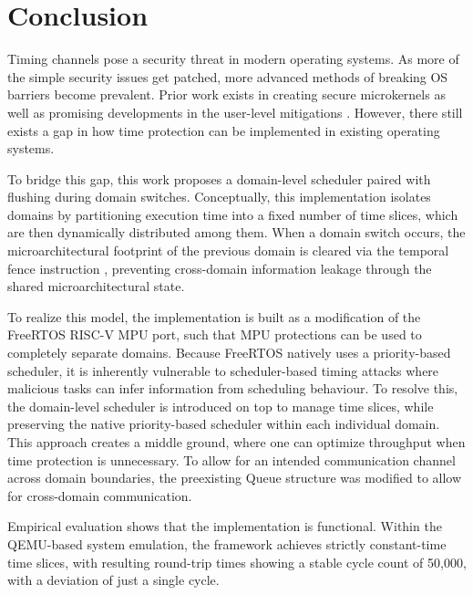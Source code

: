 \section{Conclusion}\label{sec:Conclusion}
Timing channels pose a security threat in modern operating systems. As more of
the simple security issues get patched, more advanced methods of breaking OS
barriers become prevalent. Prior work exists in creating secure microkernels
\cite{ge2019, karlsson2025} as well as promising developments in the user-level
mitigations \cite{cauligi2019}. However, there still exists a gap in how time
protection can be implemented in existing operating systems.

To bridge this gap, this work proposes a domain-level scheduler paired with
flushing during domain switches. Conceptually, this implementation isolates
domains by partitioning execution time into a fixed number of time slices,
which are then dynamically distributed among them. When a domain switch occurs,
the microarchitectural footprint of the previous domain is cleared via the
temporal fence instruction \cite{wistoff2023, wistoff2025}, preventing
cross-domain information leakage through the shared microarchitectural state.

To realize this model, the implementation is built as a modification of the
FreeRTOS RISC-V MPU port, such that MPU protections can be used to completely
separate domains. Because FreeRTOS natively uses a priority-based scheduler, it
is inherently vulnerable to scheduler-based timing attacks where malicious
tasks can infer information from scheduling behaviour. To resolve this, the
domain-level scheduler is introduced on top to manage time slices, while
preserving the native priority-based scheduler within each individual domain.
This approach creates a middle ground, where one can optimize throughput when
time protection is unnecessary. To allow for an intended communication channel
across domain boundaries, the preexisting Queue structure was modified to allow
for cross-domain communication.

Empirical evaluation shows that the implementation is functional. Within the
QEMU-based system emulation, the framework achieves strictly constant-time time
slices, with resulting round-trip times showing a stable cycle count of 50,000,
with a deviation of just a single cycle.

